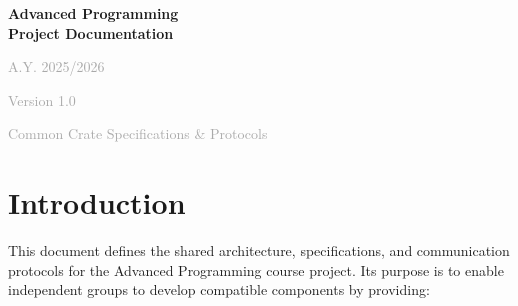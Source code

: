 \documentclass[12pt,a4paper]{article}
\begin{document}
\begin{titlepage}
    \centering
    \vspace*{2cm}
    
    
    \vspace{1cm}
    
    {\Huge\bfseries\textcolor{accent}{Advanced Programming}\\[0.5cm]
    \Huge\bfseries\textcolor{accent}{Project Documentation}}
    
    \vspace{1cm}
    
    {\Large\textcolor{darkgray}{A.Y. 2025/2026}}
    
    \vspace{0.5cm}
    
    {\Large\textcolor{darkgray}{Version 1.0}}
    
    \vspace{2cm}
    
    
    \vfill
    
    {\large\textcolor{darkgray}{Common Crate Specifications \& Protocols}}
    
    \vspace{1cm}
\end{titlepage}

\tableofcontents
\thispagestyle{empty}
\newpage

\setcounter{page}{1}




\section{Introduction}
\label{sec:introduction}

This document defines the shared architecture, specifications, and communication protocols for the Advanced Programming course project. Its purpose is to enable independent groups to develop compatible components by providing:
\end{document}
